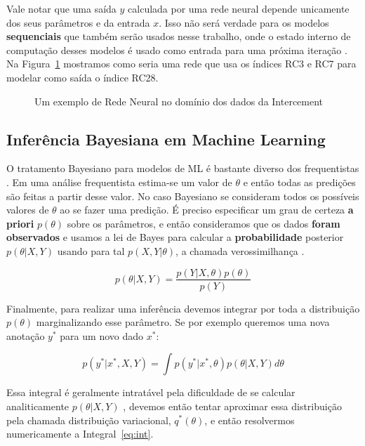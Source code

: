 Vale notar que uma saída $y$ calculada por uma rede neural depende unicamente dos
seus parâmetros e da entrada $x$. Isso não será verdade para os modelos
\textbf{sequenciais} que também serão usados nesse trabalho, onde o estado
interno de computação desses modelos é usado como entrada para uma próxima
iteração \citep{dlbook}. \\

Na Figura~\ref{fig:nn} mostramos como seria uma rede que usa os índices RC3 e RC7 para
modelar como saída o índice RC28. \\  

\begin{figure}
  \centering
  
  \caption{Um exemplo de Rede Neural no domínio dos dados da Intercement}
  \label{fig:nn}
\end{figure}


\bigskip


\subsection{Inferência Bayesiana em Machine Learning}
\label{sec:bayesinf}
O tratamento Bayesiano para modelos de ML é bastante diverso dos frequentistas \citep{dlbook}.
Em uma análise frequentista estima-se um valor de $\theta$ e então todas as
predições são feitas a partir desse valor. No caso Bayesiano se consideram todos
os possíveis valores de $\theta$ ao se fazer uma predição. É preciso especificar
um grau de certeza \textbf{a priori} $p(\theta)$ sobre os parâmetros, e então
consideramos que os dados \textbf{foram observados} e usamos a lei de Bayes para
calcular a \textbf{probabilidade} posterior $p(\theta | X,Y)$ usando para tal
$p(X,Y | \theta)$, a chamada verossimilhança \citep{bayesml}. 

\[    p(\theta | X,Y) = \frac{p(Y| X,\theta) p(\theta)}{p(Y)}   \]

Finalmente, para realizar uma inferência devemos integrar por toda a distribuição $p(\theta)$ marginalizando esse parâmetro. Se por exemplo queremos uma nova anotação $y^*$ para um novo dado $x^*$:


\begin{equation}
  \label{eq:int}
p(y^* | x^* , X,Y) = \int  p(y^* | x^*,\theta) p(\theta | X,Y)  d\theta 
\end{equation}

Essa integral é geralmente intratável pela dificuldade de se calcular
analiticamente $p(\theta | X,Y)$ \citep{ubertime}, devemos então tentar aproximar essa distribuição
pela chamada distribuição variacional, $q^*(\theta)$, e então resolvermos numericamente a Integral~\ref{eq:int}.

